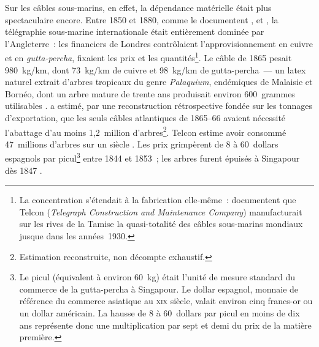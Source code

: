 %
Sur les câbles sous-marins, en effet, la dépendance matérielle était plus spectaculaire encore. Entre 1850 et 1880, comme le documentent \textcite{headrick_invisible_1991}, \textcite{hunt_imperial_2021} et \textcite{bertho_histoire_1984}, la télégraphie sous-marine internationale était entièrement dominée par l'Angleterre~: les financiers de Londres contrôlaient l'approvisionnement en cuivre et en \emph{gutta-percha}, fixaient les prix et les quantités\footnote{La concentration s'étendait à la fabrication elle-même~: \textcite{muller_telegraph_2015} documentent que Telcon (\emph{Telegraph Construction and Maintenance Company}) manufacturait sur les rives de la Tamise la quasi-totalité des câbles sous-marins mondiaux jusque dans les années~1930.}. Le câble de 1865 pesait 980~kg/km, dont 73~kg/km de cuivre et 98~kg/km de gutta-percha~--- un latex naturel extrait d'arbres tropicaux du genre \emph{Palaquium}, endémiques de Malaisie et Bornéo, dont un arbre mature de trente ans produisait environ 600~grammes utilisables \parencite{greene_dark_2005, sanzo_around_2023}. \textcite{tully_victorian_2009} a estimé, par une reconstruction rétrospective fondée sur les tonnages d'exportation, que les seuls câbles atlantiques de 1865--66 avaient nécessité l'abattage d'au moins 1,2~million d'arbres\footnote{Estimation reconstruite, non décompte exhaustif.}. Telcon estime avoir consommé 47~millions d'arbres sur un siècle \parencite{greene_dark_2005}. Les prix grimpèrent de 8 à 60~dollars espagnols par picul\footnote{Le picul (équivalent à environ 60~kg) était l'unité de mesure standard du commerce de la gutta-percha à Singapour. Le dollar espagnol, monnaie de référence du commerce asiatique au \textsc{xix}\ieme{} siècle, valait environ cinq francs-or ou un dollar américain. La hausse de 8 à 60~dollars par picul en moins de dix ans représente donc une multiplication par sept et demi du prix de la matière première.} entre 1844 et 1853~; les arbres furent épuisés à Singapour dès 1847 \parencite{sanzo_around_2023, buckley_anecdotal_1902}.

